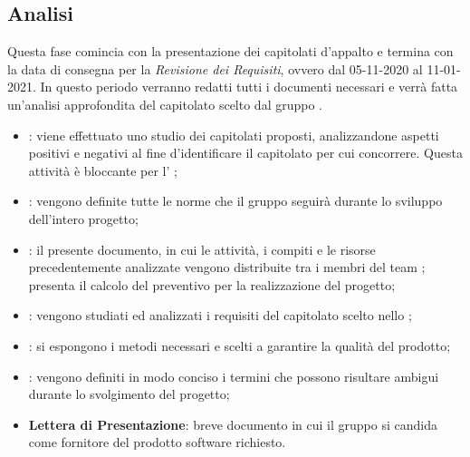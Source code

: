\subsection{Analisi}
Questa fase comincia con la presentazione dei capitolati d'appalto e termina con la data di consegna per la \textit{Revisione dei Requisiti}, ovvero dal 05-11-2020 al 11-01-2021.
In questo periodo verranno redatti tutti i documenti necessari e verrà fatta un'analisi approfondita del capitolato scelto dal gruppo \Gruppo{}.
\begin{itemize}
\item \textbf{\SdF}: viene effettuato uno studio dei capitolati proposti, analizzandone aspetti positivi e negativi al fine d'identificare il capitolato per cui concorrere. Questa attività è bloccante per l'\textit{\AdR} ;
\item \textbf{\NdP}: vengono definite tutte le norme che il gruppo \Gruppo{} seguirà durante lo sviluppo dell'intero progetto;
\item \textbf{\PdP}: il presente documento, in cui le attività, i compiti\glo{} e le risorse precedentemente analizzate vengono distribuite tra i membri del team \Gruppo{}; presenta il calcolo del preventivo per la realizzazione del progetto;
\item \textbf{\AdR}: vengono studiati ed analizzati i requisiti del capitolato\glo{} scelto nello \textit{\SdF};
\item \textbf{\PdQ}: si espongono i metodi necessari e scelti a garantire la qualità del prodotto;
\item \textbf{\Glossario}: vengono definiti in modo conciso i termini che possono risultare ambigui durante lo svolgimento del progetto;
\item \textbf{Lettera di Presentazione}: breve documento in cui il gruppo \Gruppo{} si candida come fornitore del prodotto software richiesto.
\end{itemize}
